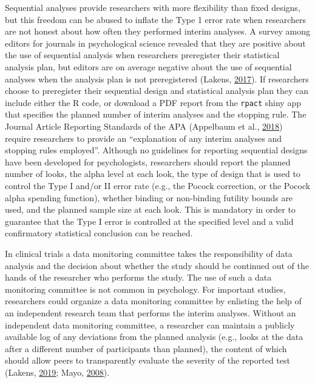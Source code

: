 \documentclass[
  english,
  ,man,floatsintext]{apa6}
\begin{document}
Sequential analyses provide researchers with more flexibility than fixed designs, but this freedom can be abused to inflate the Type 1 error rate when researchers are not honest about how often they performed interim analyses. A survey among editors for journals in psychological science revealed that they are positive about the use of sequential analysis when researchers preregister their statistical analysis plan, but editors are on average negative about the use of sequential analyses when the analysis plan is not preregistered (Lakens, \protect\hyperlink{ref-lakens_will_2017}{2017}). If researchers choose to preregister their sequential design and statistical analysis plan they can include either the R code, or download a PDF report from the \texttt{rpact} shiny app that specifies the planned number of interim analyses and the stopping rule. The Journal Article Reporting Standards of the APA (Appelbaum et al., \protect\hyperlink{ref-appelbaum_journal_2018}{2018}) require researchers to provide an ``explanation of any interim analyses and stopping rules employed''. Although no guidelines for reporting sequential designs have been developed for psychologists, researchers should report the planned number of looks, the alpha level at each look, the type of design that is used to control the Type I and/or II error rate (e.g., the Pocock correction, or the Pocock alpha spending function), whether binding or non-binding futility bounds are used, and the planned sample size at each look. This is mandatory in order to guarantee that the Type I error is controlled at the specified level and a valid confirmatory statistical conclusion can be reached.

In clinical trials a data monitoring committee takes the responsibility of data analysis and the decision about whether the study should be continued out of the hands of the researcher who performs the study. The use of such a data monitoring committee is not common in psychology. For important studies, researchers could organize a data monitoring committee by enlisting the help of an independent research team that performs the interim analyses. Without an independent data monitoring committee, a researcher can maintain a publicly available log of any deviations from the planned analysis (e.g., looks at the data after a different number of participants than planned), the content of which should allow peers to transparently evaluate the severity of the reported test (Lakens, \protect\hyperlink{ref-lakens_value_2019}{2019}; Mayo, \protect\hyperlink{ref-mayo_how_2008}{2008}).
\end{document}
